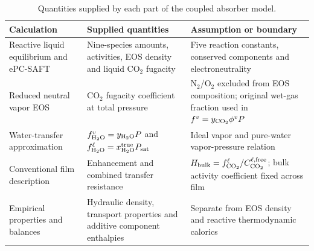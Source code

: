 \begin{table}[pos=htbp]
\centering\small
\caption{Quantities supplied by each part of the coupled absorber model.}
\label{tab:thermodynamic-responsibility}
\begin{tabularx}{\textwidth}{@{}>{\raggedright\arraybackslash}p{}XX@{}}
\toprule
Calculation & Supplied quantities & Assumption or boundary \\
\midrule
Reactive liquid equilibrium and ePC-SAFT & Nine-species amounts, activities, EOS density and liquid CO$_2$ fugacity & Five reaction constants, conserved components and electroneutrality \\
Reduced neutral vapor EOS & CO$_2$ fugacity coefficient at total pressure & N$_2$/O$_2$ excluded from EOS composition; original wet-gas fraction used in $f^v=y_{\COtwo}\phi^vP$ \\
Water-transfer approximation & $f^v_{\HtwoO}=y_{\HtwoO}P$ and $f^\ell_{\HtwoO}=x^{\mathrm{true}}_{\HtwoO}P_{\mathrm{sat}}$ & Ideal vapor and pure-water vapor-pressure relation \\
Conventional film description & Enhancement and combined transfer resistance & $H_{\mathrm{bulk}}=f^\ell_{\COtwo}/C^{\ell,\mathrm{free}}_{\COtwo}$; bulk activity coefficient fixed across film \\
Empirical properties and balances & Hydraulic density, transport properties and additive component enthalpies & Separate from EOS density and reactive thermodynamic calorics \\
\bottomrule
\end{tabularx}
\end{table}

